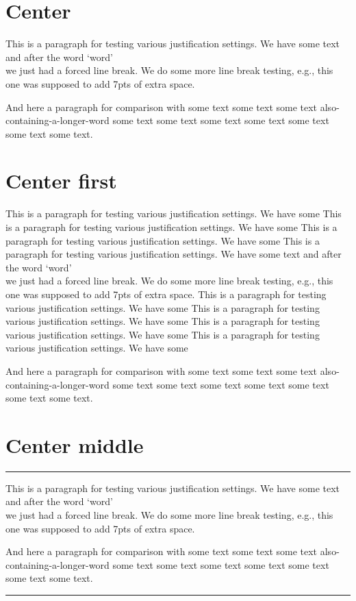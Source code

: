 \documentclass{article}
\begin{document}
\section{Center}

This is a paragraph for testing various justification settings. We have some
text and after the word `word' \\ we just had a forced line break. We
do some more line break testing, e.g., this\\[7pt] one was supposed to
add 7pts of extra space.


And here a paragraph for comparison with some text some text some text
also-containing-a-longer-word some text some text some text some text
some text some text some text.

\section{Center first}

This is a paragraph for testing various justification settings. We have some
This is a paragraph for testing various justification settings. We have some
This is a paragraph for testing various justification settings. We have some
This is a paragraph for testing various justification settings. We have some
text and after the word `word' \\ we just had a forced line break. We
do some more line break testing, e.g., this\\[7pt] one was supposed to
add 7pts of extra space.
This is a paragraph for testing various justification settings. We have some
This is a paragraph for testing various justification settings. We have some
This is a paragraph for testing various justification settings. We have some
This is a paragraph for testing various justification settings. We have some


And here a paragraph for comparison with some text some text some text
also-containing-a-longer-word some text some text some text some text
some text some text some text.


\section{Center middle}

\hrule


This is a paragraph for testing various justification settings. We have some
text and after the word `word' \\ we just had a forced line break. We
do some more line break testing, e.g., this\\[7pt] one was supposed to
add 7pts of extra space.


And here a paragraph for comparison with some text some text some text
also-containing-a-longer-word some text some text some text some text
some text some text some text.

\hrule
\end{document}
